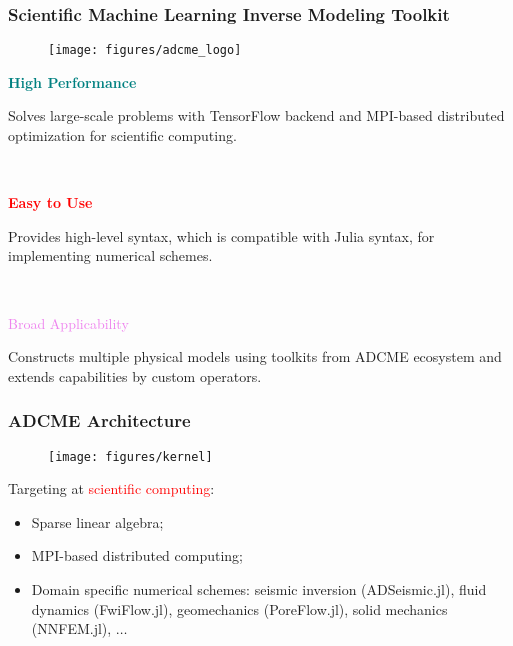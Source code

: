 \documentclass[usenames,dvipsnames]{beamer}
\begin{document}
\begin{frame}
	\frametitle{Scientific Machine Learning Inverse Modeling Toolkit}

	
		\begin{figure}[hbt]
		\centering
  \texttt{[image: figures/adcme\_logo]}
\end{figure}

\begin{minipage}[t]{0.33\textwidth}
	\begin{center}
\textcolor{teal}{\textbf{High Performance}}		
	\end{center}

	
	Solves large-scale problems with TensorFlow backend and MPI-based distributed optimization for scientific computing. 
\end{minipage}~
\begin{minipage}[t]{0.33\textwidth}

\begin{center}
\textcolor{red}{\textbf{Easy to Use}}
	\end{center}

Provides high-level syntax, which is compatible with Julia syntax, for implementing numerical schemes. 
\end{minipage}~
\begin{minipage}[t]{0.33\textwidth}

\begin{center}
\textcolor{violet}{Broad Applicability}
	\end{center}
	
	
Constructs multiple physical models using toolkits from ADCME ecosystem and extends capabilities by custom operators. 
\end{minipage}
\end{frame}
\vspace{-1.0cm}

\begin{frame}
	\frametitle{ADCME Architecture}
	
	\begin{figure}[hbt]
		\centering
  \texttt{[image: figures/kernel]}
\end{figure}
\vspace{-1.0cm}
Targeting at \textcolor{red}{scientific computing}: 
\begin{itemize}
	\item Sparse linear algebra;
	\item MPI-based distributed computing;
	\item Domain specific numerical schemes: seismic inversion (ADSeismic.jl), fluid dynamics (FwiFlow.jl), geomechanics (PoreFlow.jl), solid mechanics (NNFEM.jl), $\ldots$
\end{itemize}
\end{frame}
\end{document}
